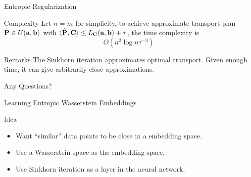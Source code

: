 \documentclass{beamer}
\renewcommand{\b}{\textbf}
\begin{document}
\begin{frame}{Entropic Regularization} 
  \begin{block}{Complexity}
    Let $n=m$ for simplicity, to achieve approximate transport plan $\hat{\b P}\in U(\b a, \b b)$ with
    $\langle {\hat{\b P}, \b C} \rangle \leq L_{\b C}(\b a, \b b) + \tau$, the
    time complexity is
    \[O(n^2\log n \tau^{-3})\]
  \end{block}

  \begin{block}{Remarks}
    The Sinkhorn iteration approximates optimal transport. Given enough time, it
    can give arbitrarily close approximations.
  \end{block}
\end{frame}

\begin{frame}{Any Questions?}
\end{frame}

\begin{frame}{Learning Entropic Wasserstein Embeddings}
  \begin{block}{Idea}
    \begin{itemize}
      \item Want ``similar'' data points to be close in a embedding space.
      \item Use a Wasserstein space as the embedding space.
      \item Use Sinkhorn iteration as a layer in the neural network.
    \end{itemize}
  \end{block}
\end{frame}
\end{document}
